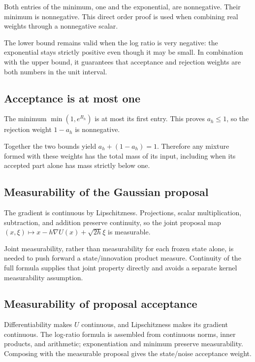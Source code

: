 \documentclass[11pt,a4paper]{article}
\begin{document}
Both entries of the minimum, one and the exponential, are nonnegative. Their minimum is nonnegative. This direct order proof is used when combining real weights through a nonnegative scalar.



The lower bound remains valid when the log ratio is very negative: the exponential stays strictly positive even though it may be small. In combination with the upper bound, it guarantees that acceptance and rejection weights are both numbers in the unit interval.


\subsection{\texorpdfstring{Acceptance is at most one}{Acceptance is at most one}}


The minimum \(\min(1,e^{R_h})\) is at most its first entry. This proves \(a_h\le1\), so the rejection weight \(1-a_h\) is nonnegative.



Together the two bounds yield \(a_h+(1-a_h)=1\). Therefore any mixture formed with these weights has the total mass of its input, including when its accepted part alone has mass strictly below one.


\subsection{\texorpdfstring{Measurability of the Gaussian proposal}{Measurability of the Gaussian proposal}}


The gradient is continuous by Lipschitzness. Projections, scalar multiplication, subtraction, and addition preserve continuity, so the joint proposal map \((x,\xi)\mapsto x-h\nabla U(x)+\sqrt{2h}\xi\) is measurable.



Joint measurability, rather than measurability for each frozen state alone, is needed to push forward a state/\allowbreak{}innovation product measure. Continuity of the full formula supplies that joint property directly and avoids a separate kernel measurability assumption.


\subsection{\texorpdfstring{Measurability of proposal acceptance}{Measurability of proposal acceptance}}


Differentiability makes \(U\) continuous, and Lipschitzness makes its gradient continuous. The log-ratio formula is assembled from continuous norms, inner products, and arithmetic; exponentiation and minimum preserve measurability. Composing with the measurable proposal gives the state/\allowbreak{}noise acceptance weight.
\end{document}
